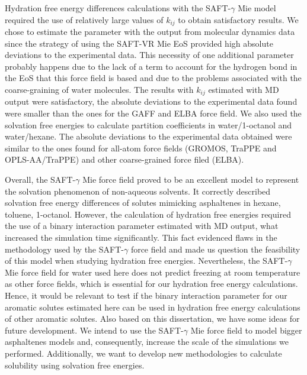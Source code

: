 Hydration free energy differences calculations with the SAFT-$\gamma$ Mie model required the use of relatively large values of $k_{ij}$ to obtain satisfactory results. We chose to estimate the parameter with the output from molecular dynamics data since the strategy of using the SAFT-VR Mie EoS provided high absolute deviations to the experimental data. This necessity of one additional parameter probably happens due to the lack of a term to account for the hydrogen bond in the EoS that this force field is based and due to the problems associated with the coarse-graining of water molecules. The results with $k_{ij}$ estimated with MD output were satisfactory, the absolute deviations to the experimental data found were smaller than the ones for the GAFF and ELBA force field. We also used the solvation free energies to calculate partition coefficients in water/1-octanol and water/hexane. The absolute deviations to the experimental data obtained were similar to the ones found for all-atom force fields (GROMOS, TraPPE and OPLS-AA/TraPPE) and other coarse-grained force filed (ELBA).

Overall, the SAFT-$\gamma$ Mie force field proved to be an excellent model to represent the solvation phenomenon of non-aqueous solvents. It correctly described solvation free energy differences of solutes mimicking asphaltenes in hexane, toluene, 1-octanol. However, the calculation of hydration free energies required the use of a binary interaction parameter estimated with MD output, what increased the simulation time significantly. This fact evidenced flaws in the methodology used by the SAFT-$\gamma$ force field and made us question the feasibility of this model when studying hydration free energies. Nevertheless, the SAFT-$\gamma$ Mie force field for water used here does not predict freezing at room temperature as other force fields, which is essential for our hydration free energy calculations. Hence, it would be relevant to test if the binary interaction parameter for our aromatic solutes estimated here can be used in hydration free energy calculations of other aromatic solutes. Also based on this dissertation, we have some ideas for future development. We intend to use the SAFT-$\gamma$ Mie force field to model bigger asphaltenes models and, consequently, increase the scale of the simulations we performed. Additionally, we want to develop new methodologies to calculate solubility using solvation free energies.


